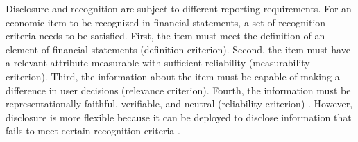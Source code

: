 \documentclass[a4paper]{article}
\begin{document}
\begin{spacing}{2}
Disclosure and recognition are subject to different reporting requirements. For an economic item to be recognized in financial statements, a set of recognition criteria needs to be satisfied. First, the item must meet the definition of an element of financial statements (definition criterion). Second, the item must have a relevant attribute measurable with sufficient reliability (measurability criterion). Third, the information about the item must be capable of making a difference in user decisions (relevance criterion). Fourth, the information must be representationally faithful, verifiable, and neutral (reliability criterion) \cite{fasbStatementFinancialAccounting1984}. However, disclosure is more flexible because it can be deployed to disclose information that fails to meet certain recognition criteria \cite[par. 7b]{fasbStatementFinancialAccounting1984}. 


\end{spacing}
\end{document}
